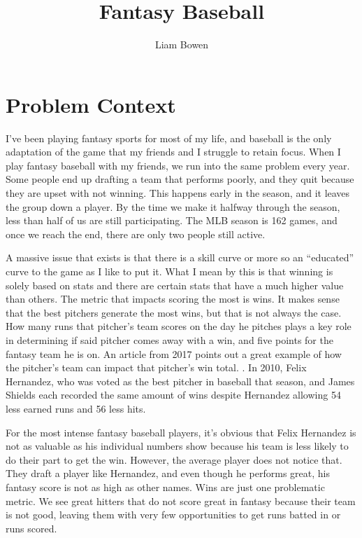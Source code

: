 \documentclass[10pt,twocolumn]{article}
\title{Fantasy Baseball}
\author{Liam Bowen}
\affiliation{Occidental College}
\begin{document}
\maketitle

\section{Problem Context}

I’ve been playing fantasy sports for most of my life, and baseball is the only adaptation of the game that my friends and I struggle to retain focus. When I play fantasy baseball with my friends, we run into the same problem every year. Some people end up drafting a team that performs poorly, and they quit because they are upset with not winning. This happens early in the season, and it leaves the group down a player. By the time we make it halfway through the season, less than half of us are still participating. The MLB season is 162 games, and once we reach the end, there are only two people still active. 

	A massive issue that exists is that there is a skill curve or more so an “educated” curve to the game as I like to put it. What I mean by this is that winning is solely based on stats and there are certain stats that have a much higher value than others. The metric that impacts scoring the most is wins. It makes sense that the best pitchers generate the most wins, but that is not always the case. How many runs that pitcher's team scores on the day he pitches plays a key role in determining if said pitcher comes away with a win, and five points for the fantasy team he is on. An article from 2017 points out a great example of how the pitcher’s team can impact that pitcher’s win total. \cite{Joyce}.  In 2010, Felix Hernandez, who was voted as the best pitcher in baseball that season, and James Shields each recorded the same amount of wins despite Hernandez allowing 54 less earned runs and 56 less hits.
	
	For the most intense fantasy baseball players, it’s obvious that Felix Hernandez is not as valuable as his individual numbers show because his team is less likely to do their part to get the win. However, the average player does not notice that. They draft a player like Hernandez, and even though he performs great, his fantasy score is not as high as other names. Wins are just one problematic metric. We see great hitters that do not score great in fantasy because their team is not good, leaving them with very few opportunities to get runs batted in or runs scored.
	
\end{document}
